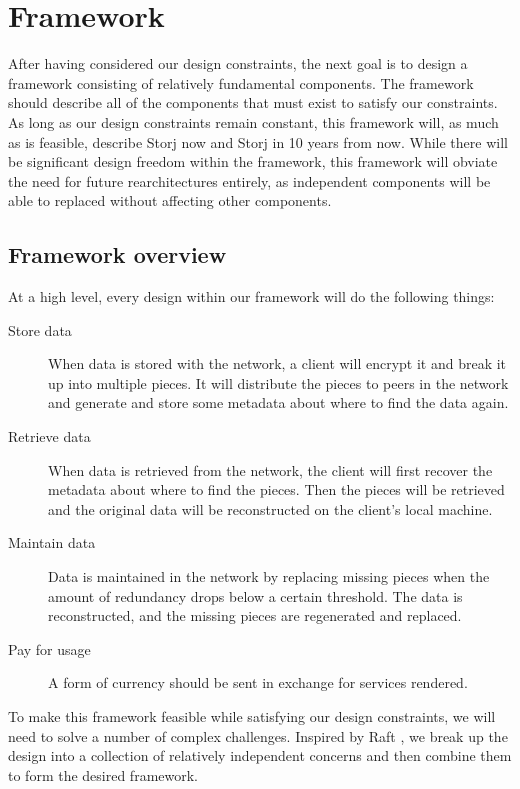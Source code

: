 \documentclass[11pt,fleqn,openany]{book}
\begin{document}
\chapter{Framework}\label{sec:framework}

After having considered our design constraints, the next goal is to design
a framework consisting of relatively fundamental components.
The framework should describe
all of the components that must exist to satisfy our constraints.
As long as our design constraints remain constant, this framework will, as
much as is feasible, describe Storj now and Storj in 10 years from now.
While there will be significant design freedom within the framework,
this framework will obviate the need for future rearchitectures entirely, as
independent components will be able to replaced without affecting other
components.

\section{Framework overview}

At a high level, every design within our framework will do the following
things:

\begin{description}

\item[Store data] When data is stored with the network, a client will encrypt
it and break it up into multiple pieces. It will distribute the pieces
to peers in the network and generate and store some metadata about where to
find the data again.

\item[Retrieve data] When data is retrieved from the network,
the client will first recover the metadata about where to find the pieces.
Then the pieces will be retrieved and the original data will be reconstructed
on the client's local machine.

\item[Maintain data] Data is maintained in the network by replacing
missing pieces when the amount of redundancy drops below a certain threshold.
The data is reconstructed, and the missing pieces are regenerated and replaced.

\item[Pay for usage] A form of currency should be sent in exchange for
services rendered.

\end{description}

To make this framework feasible while satisfying our design constraints, we
will need to solve a number of complex challenges.
Inspired by Raft \cite{raft}, we
break up the design into a collection of relatively independent concerns and
then combine them to form the desired framework.
\end{document}

